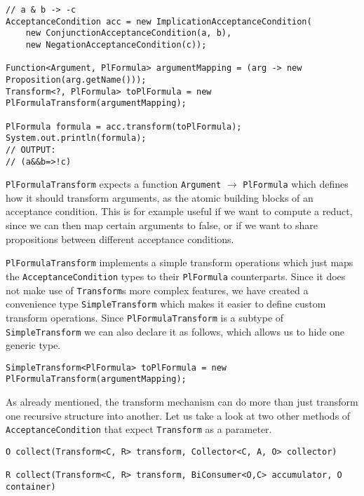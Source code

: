 \documentclass{scrartcl}[a4paper,10pt]
\newcommand{\jlstinline}[1]{\lstinline[style=java]|#1|}
\begin{document}
\begin{lstlisting}[style=java,caption=Transform-Method Signature]
// a & b -> -c
AcceptanceCondition acc = new ImplicationAcceptanceCondition(
	new ConjunctionAcceptanceCondition(a, b),
	new NegationAcceptanceCondition(c));

Function<Argument, PlFormula> argumentMapping = (arg -> new Proposition(arg.getName()));
Transform<?, PlFormula> toPlFormula = new PlFormulaTransform(argumentMapping);

PlFormula formula = acc.transform(toPlFormula);
System.out.println(formula);
// OUTPUT: 
// (a&&b=>!c)
\end{lstlisting}

\jlstinline{PlFormulaTransform} expects a function \jlstinline{Argument} $\rightarrow$ \jlstinline{PlFormula} which defines how it should transform arguments, as the atomic building blocks of an acceptance condition. This is for example useful if we want to compute a reduct, since we can then map certain arguments to false, or if we want to share propositions between different acceptance conditions.

\jlstinline{PlFormulaTransform} implements a simple transform operations which just maps the \jlstinline{AcceptanceCondition} types to their \jlstinline{PlFormula} counterparts. Since it does not make use of \jlstinline{Transform}s more complex features, we have created a convenience type \jlstinline{SimpleTransform} which makes it easier to define custom transform operations. Since \jlstinline{PlFormulaTransform} is a subtype of \jlstinline{SimpleTransform} we can also declare it as follows, which allows us to hide one generic type.

\begin{lstlisting}[style=java,caption=SimpleTransform declaration]
SimpleTransform<PlFormula> toPlFormula = new PlFormulaTransform(argumentMapping);
\end{lstlisting}

As already mentioned, the transform mechanism can do more than just transform one recursive structure into another. Let us take a look at two other methods of \jlstinline{AcceptanceCondition} that expect \jlstinline{Transform} as a parameter.

\begin{lstlisting}[style=java,caption=Access a stream of links]
O collect(Transform<C, R> transform, Collector<C, A, O> collector)

R collect(Transform<C, R> transform, BiConsumer<O,C> accumulator, O container)
\end{lstlisting}
\end{document}
